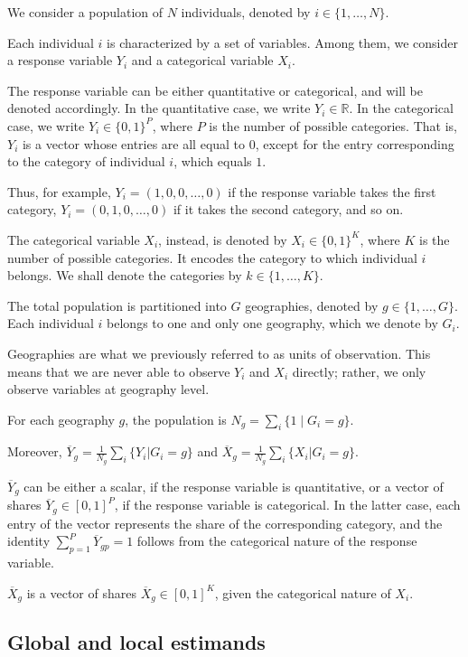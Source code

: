 We consider a population of $N$ individuals, denoted by $i \in \{1,\ldots,N\}$.

Each individual $i$ is characterized by a set of variables.
Among them, we consider a response variable $Y_i$ and a categorical variable $X_i$.

The response variable can be either quantitative or categorical, and will be denoted accordingly.
In the quantitative case, we write $Y_i \in \mathbb{R}$.
In the categorical case, we write $Y_i \in \{0,1\}^P$, where $P$ is the number of possible categories. That is, $Y_i$ is a vector whose entries are all equal to $0$, except for the entry corresponding to the category of individual $i$, which equals $1$.

Thus, for example, $Y_i = (1, 0, 0, \ldots, 0)$ if the response variable takes the first category, $Y_i = (0,1,0, \ldots, 0)$ if it takes the second category, and so on.

The categorical variable $X_i$, instead, is denoted by $X_i \in \{0,1\}^K$, where $K$ is the number of possible categories. It encodes the category to which individual $i$ belongs.
We shall denote the categories by $k \in \{1,\ldots,K\}$.

The total population is partitioned into $G$ geographies, denoted by $g \in \{1,\ldots,G\}$. Each individual $i$ belongs to one and only one geography, which we denote by $G_i$.

Geographies are what we previously referred to as units of observation.
This means that we are never able to observe $Y_i$ and $X_i$ directly; rather, we only observe variables at geography level.

For each geography $g$, the population is $N_g = \sum_i \{1 \mid G_i = g\}$.

Moreover, $\overline{Y}_g = \frac{1}{N_g}\sum_i \{Y_i|G_i=g\}$ and $\overline{X}_g = \frac{1}{N_g}\sum_i \{X_i|G_i=g\}$. 

$\overline{Y}_g$ can be either a scalar, if the response variable is quantitative, or a vector of shares $\overline{Y}_g \in [0,1]^P$, if the response variable is categorical.
In the latter case, each entry of the vector represents the share of the corresponding category, and the identity $\sum_{p=1}^P \overline{Y}_{gp} = 1$ follows from the categorical nature of the response variable.

$\overline{X}_g$ is a vector of shares $\overline{X}_g \in [0,1]^K$, given the categorical nature of $X_i$.

\subsection{Global and local estimands}

